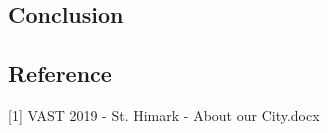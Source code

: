 \documentclass[12pt]{extarticle}
\begin{document}
\begin{centering}
	\section{Conclusion}
\end{centering}

\begin{centering}
	\section{Reference}
\end{centering}
[1] VAST 2019 - St. Himark -  About our City.docx
\end{document}

